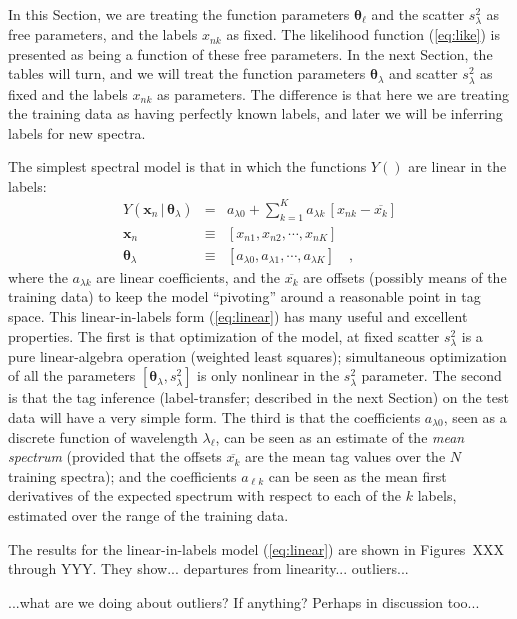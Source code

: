 \documentclass[12pt, preprint]{aastex}
\newcommand{\sectionname}{Section}
\newcommand{\set}[1]{\bm{#1}}
\newcommand{\mean}[1]{\overline{#1}}
\newcommand{\given}{\,|\,}
\begin{document}
In this \sectionname, we are treating the function parameters
$\set{\theta}_\ell$ and the scatter $s_\lambda^2$ as free parameters, and the
labels $x_{nk}$ as fixed.
The likelihood function (\ref{eq:like}) is presented as being a
function of these free parameters.
In the next \sectionname, the tables will turn, and we will treat the
function parameters $\set{\theta}_\lambda$ and scatter $s_{\lambda}^2$ as fixed and
the labels $x_{nk}$ as parameters.
The difference is that here we are treating the training data as
having perfectly known labels, and later we will be inferring labels for
new spectra.

The simplest spectral model is that in which the functions $Y()$ are
linear in the labels:
\begin{eqnarray}
Y(\set{x}_n\given\set{\theta}_\lambda) &=&
 a_{\lambda 0} + \sum_{k=1}^K a_{\lambda k}\,[x_{nk} - \mean{x_k}]
\label{eq:linear}\\
\set{x}_n &\equiv& [x_{n1}, x_{n2}, \cdots, x_{nK}]
\\
\set{\theta}_\lambda &\equiv& [a_{\lambda 0}, a_{\lambda 1}, \cdots, a_{\lambda K}]
\quad ,
\end{eqnarray}
where the $a_{\lambda k}$ are linear coefficients, and
the $\mean{x_k}$ are offsets (possibly means of the training data) to
keep the model ``pivoting'' around a reasonable point in tag space.
This linear-in-labels form (\ref{eq:linear}) has many useful and
excellent properties.
The first is that optimization of the model, at fixed scatter
$s_\lambda^2$ is a pure linear-algebra operation (weighted least
squares); simultaneous optimization of all the parameters
$[\set{\theta}_\lambda,s_\lambda^2]$ is only nonlinear in the $s_\lambda^2$
parameter.
The second is that the tag inference (label-transfer; described in the
next Section) on the test data will have a very simple form.
The third is that the coefficients $a_{\lambda 0}$, seen as a discrete
function of wavelength $\lambda_\ell$, can be seen as an estimate of
the \emph{mean spectrum} (provided that the offsets $\mean{x_k}$ are
the mean tag values over the $N$ training spectra); and the
coefficients $a_{\ell k}$ can be seen as the mean first derivatives of
the expected spectrum with respect to each of the $k$ labels, estimated
over the range of the training data.

The results for the linear-in-labels model (\ref{eq:linear}) are shown
in Figures~XXX through YYY.  They show... departures from
linearity... outliers...

...what are we doing about outliers?  If anything?  Perhaps in discussion too...
\end{document}
